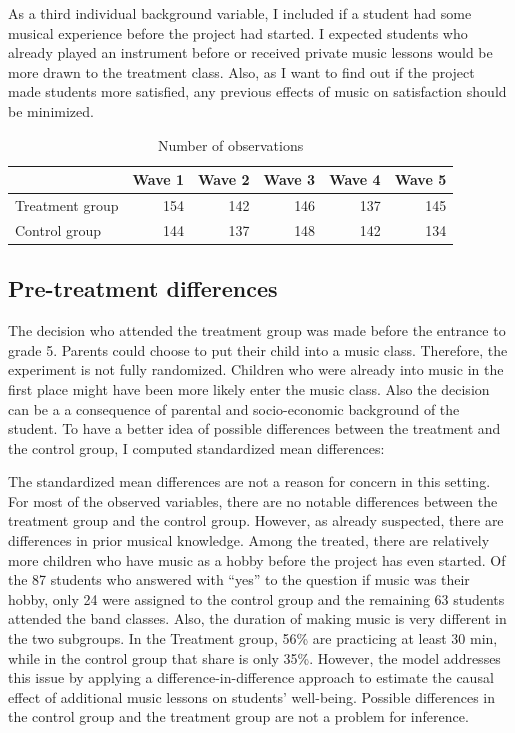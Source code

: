 \documentclass[a4, 12pt]{article}
\begin{document}
As a third individual background variable, I included if a student had some musical experience before the project had started. I expected students who already played an instrument before or received private music lessons would be more drawn to the treatment class. Also, as I want to find out if the project made students more satisfied, any previous effects of music on satisfaction should be minimized.

\begin{table}

\caption{\label{tab:N-Obs}Number of observations}
\centering
\begin{tabular}[t]{lrrrrr}
\toprule
  & Wave 1 & Wave 2 & Wave 3 & Wave 4 & Wave 5\\
\midrule
Treatment group & 154 & 142 & 146 & 137 & 145\\
Control group & 144 & 137 & 148 & 142 & 134\\
\bottomrule
\end{tabular}
\end{table}

\hypertarget{pre-treatment-differences}{%
\subsection{Pre-treatment differences}\label{pre-treatment-differences}}

\label{sec:pre-treat-diff}
The decision who attended the treatment group was made before the entrance to grade 5. Parents could choose to put their child into a music class. Therefore, the experiment is not fully randomized. Children who were already into music in the first place might have been more likely enter the music class. Also the decision can be a a consequence of parental and socio-economic background of the student. To have a better idea of possible differences between the treatment and the control group, I computed standardized mean differences:

The standardized mean differences are not a reason for concern in this setting. For most of the observed variables, there are no notable differences between the treatment group and the control group. However, as already suspected, there are differences in prior musical knowledge. Among the treated, there are relatively more children who have music as a hobby before the project has even started. Of the 87 students who answered with ``yes'' to the question if music was their hobby, only 24 were assigned to the control group and the remaining 63 students attended the band classes. Also, the duration of making music is very different in the two subgroups. In the Treatment group, 56\% are practicing at least 30 min, while in the control group that share is only 35\%. However, the model addresses this issue by applying a difference-in-difference approach to estimate the causal effect of additional music lessons on students' well-being. Possible differences in the control group and the treatment group are not a problem for inference.
\end{document}
